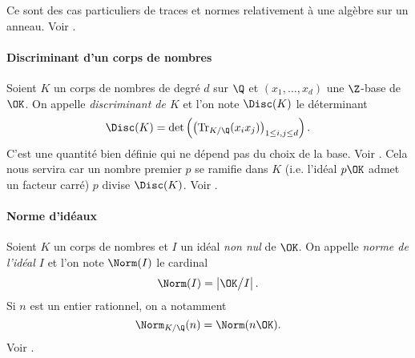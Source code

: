 	Ce sont des cas particuliers de traces et normes relativement à une algèbre sur un anneau. Voir \cite[ch. II § 6]{Samuel}.


\paragraph{Discriminant d'un corps de nombres} Soient $K$ un corps de nombres de degré $d$ sur $\Q$ et $(x_1, \dots, x_d)$ une $\Z$-base de $\OK$. On appelle \emph{discriminant de $K$} et l'on note $\Disc(K)$ le déterminant \[\Disc(K) = \det\left(\left(\mathrm{Tr}_{K/\Q}(x_i x_j)\right)_{1\leq i, j \leq d}\right).\] C'est une quantité bien définie qui ne dépend pas du choix de la base. Voir \cite[ch. II § 7]{Samuel}. Cela nous servira car un nombre premier $p$ se ramifie dans $K$ (i.e. l'idéal $p\OK$ admet un facteur carré) \ssi $p$ divise $\Disc(K)$. Voir \cite[ch. V § 3]{Samuel}.

\paragraph{Norme d'idéaux} Soient $K$ un corps de nombres et $I$ un idéal \emph{non nul} de $\OK$. On appelle \emph{norme de l'idéal $I$} et l'on note $\Norm(I)$ le cardinal \[\Norm(I) = \left|\OK\big/I\right|.\] Si $n$ est un entier rationnel, on a notamment \[\Norm_{K/\Q}(n) = \Norm(n\OK).\] Voir \cite[ch. III § 5]{Samuel}.
